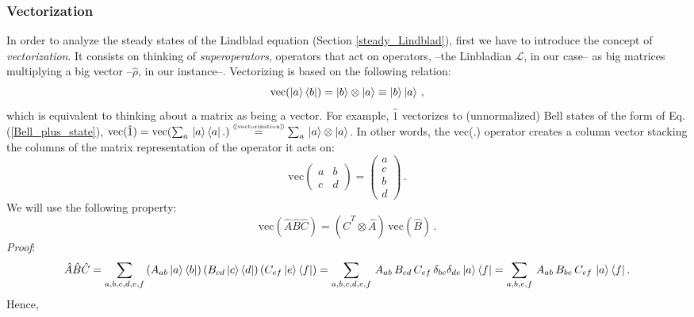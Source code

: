 \documentclass[11pt]{article}
\numberwithin{equation}{section} %
\numberwithin{figure}{section} %
\newcommand\numeq[1] %
  {\stackrel{\scriptscriptstyle(\mkern-1.5mu#1\mkern-1.5mu)}{=}}
\begin{document}
\begin{appendices}
\subsubsection{Vectorization} \label{vectorization}
In order to analyze the steady states of the Lindblad equation (Section \ref{steady_Lindblad}), first we have to introduce the concept of \emph{vectorization}. It consists on thinking of \emph{superoperators}, operators that act on operators, --the Linbladian $\mathcal{L}$, in our case-- as big matrices multiplying a big vector --$\hat{\rho}$, in our instance--. Vectorizing is based on the following relation:
\begin{equation} \label{vectorization}
\textrm{vec}(\ket{a}\bra{b})=\ket{b}\otimes\ket{a}\equiv\ket{b}\ket{a}\,\textrm{,}
\end{equation}
which is equivalent to thinking about a matrix as being a vector. For example, $\hat{1}$ vectorizes to (unnormalized) Bell states of the form of Eq. (\ref{Bell_plus_state}), $\textrm{vec}(\hat{1})=\textrm{vec}(\sum_a\,\ket{a}\bra{a}.)\numeq{\textrm{\ref{vectorization}}} \sum_a\,\ket{a}\otimes\ket{a}$. In other words, the vec(.) operator creates a column vector stacking the columns of the matrix representation of the operator it acts on:
\begin{equation} \label{vectorization_matrix}
\textrm{vec}\begin{pmatrix}a&b\\c&d\end{pmatrix}=\begin{pmatrix}a\\c\\b\\d\end{pmatrix}\,\textrm{.}
\end{equation}
We will use the following property:
\begin{equation} \label{vectorization_property}
\textrm{vec}(\hat{A}\hat{B}\hat{C})=(\hat{C}^T \otimes\hat{A})\,\textrm{vec}(\hat{B})\,\textrm{.}
\end{equation}
\emph{Proof}:
\begin{equation} \label{ABC_matrix_form}
\hat{A}\hat{B}\hat{C}=\sum_{a,b,c,d,e,f}\,(A_{ab}\ket{a}\bra{b})\,(B_{cd}\ket{c}\bra{d})\,(C_{ef}\ket{e}\bra{f}) = \sum_{a,b,c,d,e,f}\,A_{ab}\,B_{cd}\,C_{ef}\,\delta_{bc}\delta_{de}\ket{a}\bra{f}=  \sum_{a,b,e,f}\,A_{ab}\,B_{be}\,C_{ef}\,\ket{a}\bra{f}\textrm{.}
\end{equation}
Hence, 
\begin{equation} \label{vec_ABC}

\end{equation}
\end{appendices}
\end{document}
